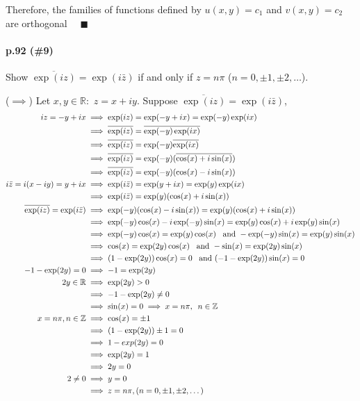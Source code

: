 \documentclass{article}
\newcommand\Z{\mathbb{Z}}
\newcommand\R{\mathbb{R}}
\begin{document}
Therefore, the families of functions defined by $u(x,y)=c_1$
and $v(x,y) = c_2$ are orthogonal $\quad \blacksquare$
\newpage
\paragraph{p.92 \color{blue} (\#9)\color{black}}

Show $\overline{\exp(iz)}= \exp(i\bar{z})$ if and only if $z = n\pi$
($n = 0, \pm 1, \pm 2,\dots$).


($\implies$) Let $x,y\in \R:$ $z = x+iy$. Suppose $\overline{\exp(iz)} = \exp(i\bar{z})$,
\begin{align*}
  iz = -y+ix &\implies \exp(iz) = \exp(-y+ix) = \exp(-y)\exp(ix)\\
             &\implies \overline{\exp(iz)} =
               \overline{\exp(-y)\exp(ix)}\\
             &\implies \overline{\exp(iz)} =
               \exp(-y)\overline{\exp(ix)}\\
  &\implies \overline{\exp(iz)} =
    \exp(-y)(\overline{\cos(x) + i \sin (x)})\\
  &\implies \overline{\exp(iz)} =
               \exp(-y)(\cos(x) - i \sin (x))\\
  i\bar{z} = i(x-iy) = y+ix &\implies \exp(i\bar{z}) = \exp(y+ix) =
                              \exp(y)\exp(ix)\\
             &\implies \exp(i\bar{z}) = \exp(y)(\cos(x)+i\sin(x))\\
  \overline{\exp(iz)}=\exp(i\bar{z}) &\implies \exp(-y)(\cos(x) - i
                                       \sin (x)) =
                                       \exp(y)(\cos(x)+i\sin(x))\\
  &\implies \exp(-y)\cos(x) - i\exp(-y)\sin (x) =
    \exp(y)\cos(x)+i\exp(y)\sin(x)\\
  &\implies \exp(-y)\cos(x) = \exp(y)\cos(x)\enskip\text{ and }
    -\exp(-y)\sin(x) = \exp(y)\sin(x)\\
  &\implies \cos(x) = \exp(2y)\cos(x)\enskip\text{ and }
    -\sin(x) = \exp(2y)\sin(x)\\
  &\implies (1  -\exp(2y))\cos(x)=0 \enskip\text{ and }
    (-1 -\exp(2y))\sin(x) = 0\\
  -1 -\exp(2y) = 0 &\implies -1 = \exp(2y)\\
  2y \in \R &\implies \exp(2y) > 0\\
             &\implies -1-\exp(2y)\neq 0\\
             &\implies \sin(x) = 0 \implies x = n\pi,\enskip n\in \Z\\
  x=n\pi, n\in\Z &\implies \cos(x) = \pm 1\\
             &\implies (1-\exp(2y))\pm 1 = 0\\
             &\implies 1-exp(2y)= 0\\
             &\implies \exp(2y) = 1\\
             &\implies 2y = 0\\
  2\neq 0 &\implies y=0\\
  &\implies z = n\pi, (n = 0,\pm 1,\pm 2,\dots)
\end{align*}
\end{document}
